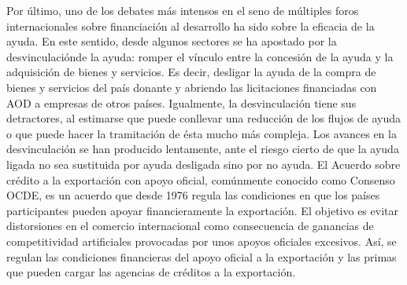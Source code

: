 \documentclass[10pt,a4paper]{article}
\begin{document}
Por último, uno de los debates más intensos en el seno de múltiples foros internacionales sobre financiación al desarrollo ha sido sobre la eficacia de la ayuda. En este sentido, desde algunos sectores se ha apostado por la desvinculaciónde la ayuda: romper el vínculo entre la concesión de la ayuda y la adquisición de bienes y servicios. Es decir, desligar la ayuda de la compra de bienes y servicios del país donante y abriendo las licitaciones financiadas con AOD a empresas de otros países. Igualmente, la desvinculación tiene sus detractores, al estimarse que puede conllevar una reducción de los flujos de ayuda o que puede hacer la tramitación de ésta mucho más compleja. Los avances en la desvinculación se han producido lentamente, ante el riesgo cierto de que la ayuda ligada no sea sustituida por ayuda desligada sino por no ayuda. El Acuerdo sobre crédito a la exportación con apoyo oficial, comúnmente conocido como Consenso OCDE, es un acuerdo que desde 1976 regula las condiciones en que los países participantes pueden apoyar financieramente la exportación. El objetivo es evitar distorsiones en el comercio internacional como consecuencia de ganancias de competitividad artificiales provocadas por unos apoyos oficiales excesivos. Así, se regulan las condiciones financieras del apoyo oficial a la exportación y las primas que pueden cargar las agencias de créditos a la exportación.
\end{document}
